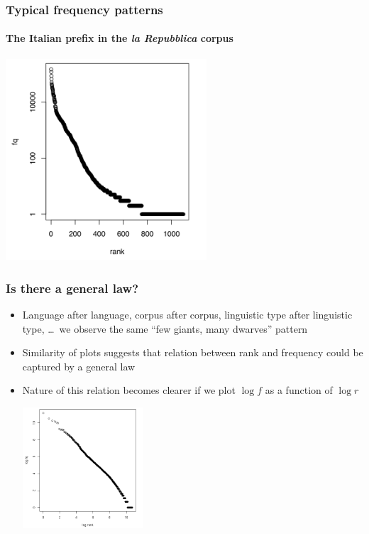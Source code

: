 \documentclass[t]{beamer} %
\begin{document}
\begin{frame}
  \frametitle{Typical frequency patterns} 
  \framesubtitle{The Italian prefix \textcite{ri-} in the \emph{la Repubblica} corpus}

  \ungap[1.5]
  \begin{center}
    \includegraphics[height=7.5cm]{img/ita-ri-rf}
  \end{center}
\end{frame}

\begin{frame}
  \frametitle{Is there a general law?}

  \begin{itemize}
  \item Language after language, corpus after corpus, linguistic type after
    linguistic type, \ldots\ we observe the same ``few giants, many dwarves'' pattern 
  \item Similarity of plots suggests that relation between rank and
    frequency could be captured by a general law%
    \pause
  \item Nature of this relation becomes clearer if we plot $\log f$ as a
    function of $\log r$ %
    \vspace{-5mm}
    \begin{center}
      \hspace{2cm}
      \includegraphics[height=45mm]{img/brown-loglog-rf}
    \end{center}
  \end{itemize}

\end{frame}
\end{document}
